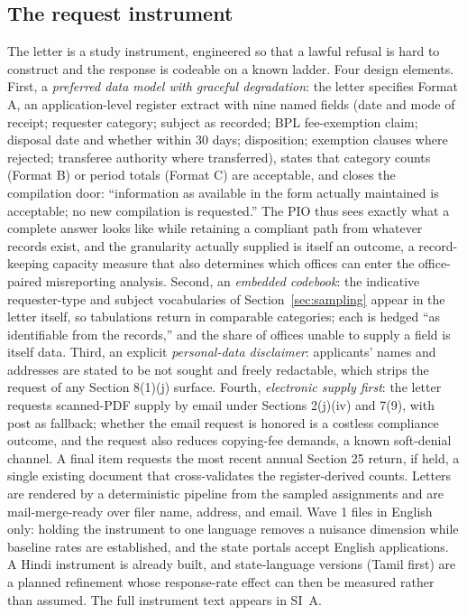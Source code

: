 \documentclass[11pt]{article}
\begin{document}
\subsection{The request instrument}
\label{sec:instruments}

The letter is a study instrument, engineered so that a lawful refusal is hard to construct and the response is codeable on a known ladder. Four design elements. First, a \emph{preferred data model with graceful degradation}: the letter specifies Format A, an application-level register extract with nine named fields (date and mode of receipt; requester category; subject as recorded; BPL fee-exemption claim; disposal date and whether within 30 days; disposition; exemption clauses where rejected; transferee authority where transferred), states that category counts (Format B) or period totals (Format C) are acceptable, and closes the compilation door: ``information as available in the form actually maintained is acceptable; no new compilation is requested.'' The PIO thus sees exactly what a complete answer looks like while retaining a compliant path from whatever records exist, and the granularity actually supplied is itself an outcome, a record-keeping capacity measure that also determines which offices can enter the office-paired misreporting analysis. Second, an \emph{embedded codebook}: the indicative requester-type and subject vocabularies of Section~\ref{sec:sampling} appear in the letter itself, so tabulations return in comparable categories; each is hedged ``as identifiable from the records,'' and the share of offices unable to supply a field is itself data. Third, an explicit \emph{personal-data disclaimer}: applicants' names and addresses are stated to be not sought and freely redactable, which strips the request of any Section 8(1)(j) surface. Fourth, \emph{electronic supply first}: the letter requests scanned-PDF supply by email under Sections 2(j)(iv) and 7(9), with post as fallback; whether the email request is honored is a costless compliance outcome, and the request also reduces copying-fee demands, a known soft-denial channel. A final item requests the most recent annual Section 25 return, if held, a single existing document that cross-validates the register-derived counts. Letters are rendered by a deterministic pipeline from the sampled assignments and are mail-merge-ready over filer name, address, and email. Wave 1 files in English only: holding the instrument to one language removes a nuisance dimension while baseline rates are established, and the state portals accept English applications. A Hindi instrument is already built, and state-language versions (Tamil first) are a planned refinement whose response-rate effect can then be measured rather than assumed. The full instrument text appears in SI~A.
\end{document}
